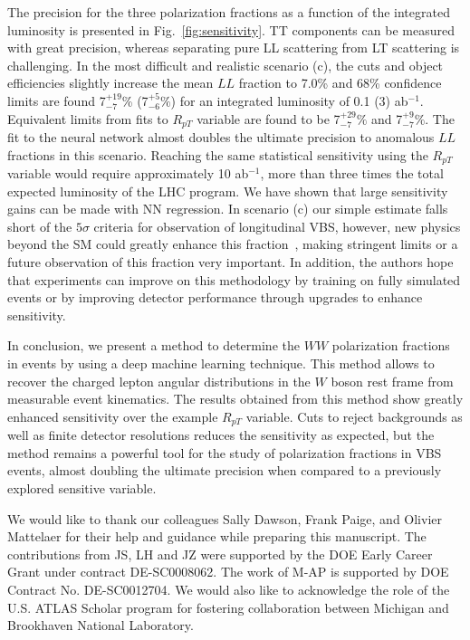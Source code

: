 The precision for the three polarization fractions as a function of the integrated luminosity is presented in Fig.~\ref{fig:sensitivity}. 
 TT components can be measured with great precision, whereas separating pure LL scattering from LT scattering is challenging.
In the most difficult and realistic scenario (c), the cuts and object efficiencies slightly increase the mean $LL$ fraction to 7.0\% and 68\% confidence limits are found 7$^{+19}_{-7}$\% (7$^{+5}_{-6}\%$) for an integrated luminosity of 0.1 (3) ab$^{-1}$.  Equivalent limits from fits to $R_{pT}$ variable are found to be 7$^{+29}_{-7}\%$ and 7$^{+9}_{-7}\%$. The fit to the neural network almost doubles the ultimate precision to anomalous $LL$ fractions in this scenario. Reaching the same statistical sensitivity using the $R_{pT}$ variable would require approximately 10 ab$^{-1}$, more than three times the total expected luminosity of the LHC program. We have shown that large sensitivity gains can be made with NN regression. In scenario (c) our simple estimate falls short of the $5\sigma$ criteria for observation of longitudinal VBS, however, new physics beyond the SM could greatly enhance this fraction~\cite{VLVLBSM}, making stringent limits or a future observation of this fraction very important. In addition, the authors hope that experiments can improve on this methodology by training on fully simulated events or by improving detector performance through upgrades to enhance sensitivity. 

In conclusion, we present a method to determine the $WW$ polarization fractions in
\ssWW events by using a deep machine learning technique.  This method
allows to recover the charged lepton angular distributions in the $W$
boson rest frame from measurable event kinematics.  The
results obtained from this method show greatly enhanced sensitivity over
the example $R_{pT}$ variable.  Cuts to reject
backgrounds as well as finite detector resolutions reduces the sensitivity as
expected, but the method remains a powerful tool for the study of
polarization fractions in VBS events, almost doubling the ultimate precision when compared to a previously explored sensitive variable.

We would like to thank our colleagues Sally Dawson, Frank Paige, and Olivier Mattelaer for their help and guidance while preparing this manuscript.
The contributions from JS, LH and JZ were supported by the DOE Early Career Grant under contract DE-SC0008062. The work of M-AP is supported by DOE Contract No. DE-SC0012704. We would also like to acknowledge the role of the U.S. ATLAS Scholar program for fostering collaboration between Michigan and Brookhaven National Laboratory.





